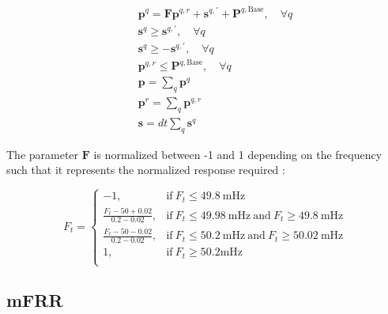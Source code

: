 \documentclass[lettersize,journal]{IEEEtran}
\begin{document}
\begin{subequations} \label{P1:constraints}
    \begin{align}
              & \bm{p}^{q} = \bm{F} \bm{p}^{q,r} + \bm{s}^{q, \prime} + \bm{P}^{q, \text{Base}}, \quad \forall{q}  \label{P1:co2} \\
        \quad & \bm{s}^{q} \geq \bm{s}^{q, \prime}, \quad \forall{q}  \label{P1:co3}
        \\
        \quad & \bm{s}^{q} \geq -\bm{s}^{q,\prime}, \quad \forall{q}  \label{P1:co4}
        \\
        \quad & \bm{p}^{q,r} \leq \bm{P}^{q,\text{Base}} , \quad \forall{q} \label{P1:co8}
        \\
        \quad & \bm{p} = \sum_{q} \bm{p}^{q}   \label{P1:co5}                                                                     \\
        \quad & \bm{p}^{r} = \sum_{q} \bm{p}^{q,r}   \label{P1:co6}                                                               \\
        \quad & \bm{s} = dt \sum_{q} \bm{s}^{q}   \label{P1:co7}
    \end{align}
\end{subequations}

The parameter $\bm{F}$ is normalized between -1 and 1 depending on the frequency such that it represents the normalized response required \cite{energinet:prequalification}:

\begin{equation}
    F_{t} =
    \begin{cases}
        -1,                             & \text{if}\ F_{t} \leq 49.8\ \text{mHz}                                           \\
        \frac{F_{t}-50+0.02}{0.2-0.02}, & \text{if}\ F_{t} \leq 49.98\ \text{mHz}\ \text{and}\ F_{t} \geq 49.8\ \text{mHz} \\
        \frac{F_{t}-50-0.02}{0.2-0.02}, & \text{if}\ F_{t} \leq 50.2\ \text{mHz}\ \text{and}\ F_{t} \geq 50.02\ \text{mHz} \\
        1,                              & \text{if}\ F_{t} \geq 50.2 \text{mHz}                                            \\
    \end{cases}
\end{equation}

\subsection{mFRR}
\end{document}
